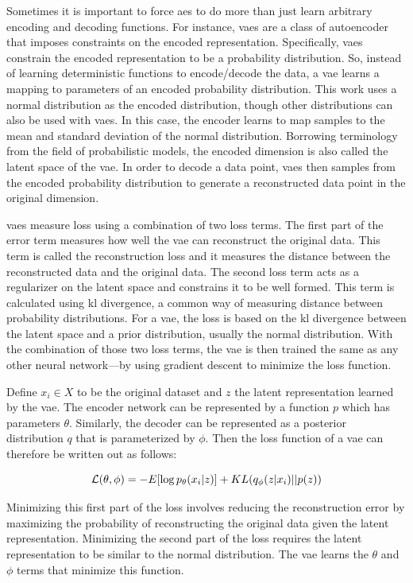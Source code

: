Sometimes it is important to force \glspl{ae} to do more than just learn arbitrary encoding and decoding functions.
For instance, \glspl{vae} are a class of autoencoder that imposes constraints on the encoded representation.
Specifically, \glspl{vae} constrain the encoded representation to be a probability distribution.
So, instead of learning deterministic functions to encode/decode the data, a \gls{vae} learns a mapping to parameters of an encoded probability distribution.
This work uses a normal distribution as the encoded distribution, though other distributions can also be used with \glspl{vae}.
In this case, the encoder learns to map samples to the mean and standard deviation of the normal distribution.
Borrowing terminology from the field of probabilistic models, the encoded dimension is also called the latent space of the \gls{vae}.
In order to decode a data point, \glspl{vae} then samples from the encoded probability distribution to generate a reconstructed data point in the original dimension.

\glspl{vae} measure loss using a combination of two loss terms.
The first part of the error term measures how well the \gls{vae} can reconstruct the original data.
This term is called the reconstruction loss and it measures the distance between the reconstructed data and the original data.
The second loss term acts as a regularizer on the latent space and constrains it to be well formed.
This term is calculated using \gls{kl} divergence, a common way of measuring distance between probability distributions.
For a \gls{vae}, the loss is based on the \gls{kl} divergence between the latent space and a prior distribution, usually the normal distribution. 
With the combination of those two loss terms, the \gls{vae} is then trained the same as any other neural network---by using gradient descent to minimize the loss function.

Define $x_i \in X$ to be the original dataset and $z$ the latent representation learned by the \gls{vae}.
The encoder network can be represented by a function $p$ which has parameters $\theta$.
Similarly, the decoder can be represented as a posterior distribution $q$ that is parameterized by $\phi$.
Then the loss function of a \gls{vae} can therefore be written out as follows:

\begin{equation}\label{eqn:vae-loss}
\mathcal{L}(\theta, \phi) = - E[\log p_{\theta}(x_i | z)] + KL(q_{\phi}(z | x_i) || p(z)) \\
\end{equation}

Minimizing this first part of the loss involves reducing the reconstruction error by maximizing the probability of reconstructing the original data given the latent representation.
Minimizing the second part of the loss requires the latent representation to be similar to the normal distribution.
The \gls{vae} learns the $\theta$ and $\phi$ terms that minimize this function.
